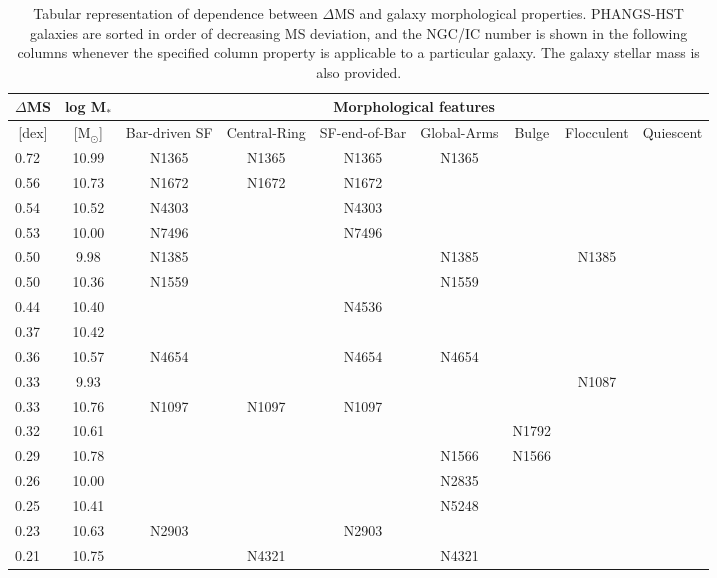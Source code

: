 \documentclass[linenumbers]{aastex63}
\begin{document}
\begin{table*}
\centering
\begin{center}
\caption{Tabular representation of dependence between $\Delta$MS and galaxy morphological properties. PHANGS-HST galaxies are sorted in order of decreasing MS deviation, and the NGC/IC number is shown in the following columns whenever the specified column property is applicable to a particular galaxy.  The galaxy stellar mass is also provided.}
\label{tab:DeltaMS}
\begin{threeparttable}
\begin{tabular}{lcccccccc}
\hline\hline
\multicolumn{1}{c}{$\Delta$MS} & \multicolumn{1}{c}{log M$_*$} & \multicolumn{7}{c}{Morphological features} \\ 
\hline
\multicolumn{1}{c}{[dex]} & \multicolumn{1}{c}{[M$_{\odot}$]} & \multicolumn{1}{c}{Bar-driven SF \tnote{a}} & 
\multicolumn{1}{c}{Central-Ring} & 
\multicolumn{1}{c}{SF-end-of-Bar \tnote{b}} & 
\multicolumn{1}{c}{Global-Arms \tnote{c}} & 
\multicolumn{1}{c}{Bulge \tnote{d}} & 
\multicolumn{1}{c}{Flocculent \tnote{e}} & 
\multicolumn{1}{c}{Quiescent \tnote{f}} \\ 
\hline
0.72 & 10.99 & N1365 & N1365 & N1365 & N1365 &  &  & \\
0.56 & 10.73 & N1672 & N1672 & N1672 &  &  &  & \\
0.54 & 10.52 & N4303 &  & N4303 &  &  &  & \\
0.53 & 10.00 & N7496 &  & N7496 &  &  &  & \\
0.50 & 9.98 & N1385 &  &  & N1385 &  & N1385 & \\
0.50 & 10.36 & N1559 &  &  & N1559 &  &  & \\
0.44 & 10.40 &  &  & N4536 &  &  &  & \\
0.37 & 10.42 &  &  &  &  &  &  & \\
0.36 & 10.57 & N4654 &  & N4654 & N4654 &  &  & \\
0.33 & 9.93 &  &  &  &  &  & N1087 & \\
0.33 & 10.76 & N1097 & N1097 & N1097 &  &  &  & \\
0.32 & 10.61 &  &  &  &  & N1792 &  & \\
0.29 & 10.78 &  &  &  & N1566 & N1566 &  & \\
0.26 & 10.00 &  &  &  & N2835 &  &  & \\
0.25 & 10.41 &  &  &  & N5248 &  &  & \\
0.23 & 10.63 & N2903 &  & N2903 &  &  &  & \\
0.21 & 10.75 &  & N4321 &  & N4321 &  &  & \\

\end{tabular}
\end{threeparttable}
\end{center}
\end{table*}
\end{document}
